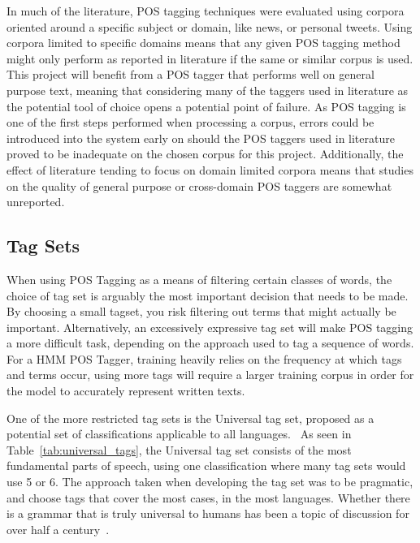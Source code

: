 \documentclass[10pt]{report}
\begin{document}
In much of the literature, POS tagging techniques were evaluated using corpora oriented around a specific subject or domain, like news, or personal tweets. Using corpora limited to specific domains means that any given POS tagging method might only perform as reported in literature if the same or similar corpus is used. This project will benefit from a POS tagger that performs well on general purpose text, meaning that considering many of the taggers used in literature as the potential tool of choice opens a potential point of failure. As POS tagging is one of the first steps performed when processing a corpus, errors could be introduced into the system early on should the POS taggers used in literature proved to be inadequate on the chosen corpus for  this project. Additionally, the effect of literature tending to focus on domain limited corpora means that studies on the quality of general purpose or cross-domain POS taggers are somewhat unreported.

\subsection{Tag Sets}
When using POS Tagging as a means of filtering certain classes of words, the choice of tag set is arguably the most important decision that needs to be made. By choosing a small tagset, you risk filtering out terms that might actually be important. Alternatively, an excessively expressive tag set will make POS tagging a more difficult task, depending on the approach used to tag a sequence of words. For a HMM POS Tagger, training heavily relies on the frequency at which tags and terms occur, using more tags will require a larger training corpus in order for the model to accurately represent written texts.

One of the more restricted tag sets is the Universal tag set, proposed as a potential set of classifications applicable to all languages.~\cite{DBLP:journals/corr/abs-1104-2086} As seen in Table~\ref{tab:universal_tags}, the Universal tag set consists of the most fundamental parts of speech, using one classification where many tag sets would use 5 or 6. The approach taken when developing the tag set was to be pragmatic, and choose tags that cover the most cases, in the most languages. Whether there is a grammar that is truly universal to humans has been a topic of discussion for over half a century~\cite{Dabrowska2015-qm}.
\end{document}
